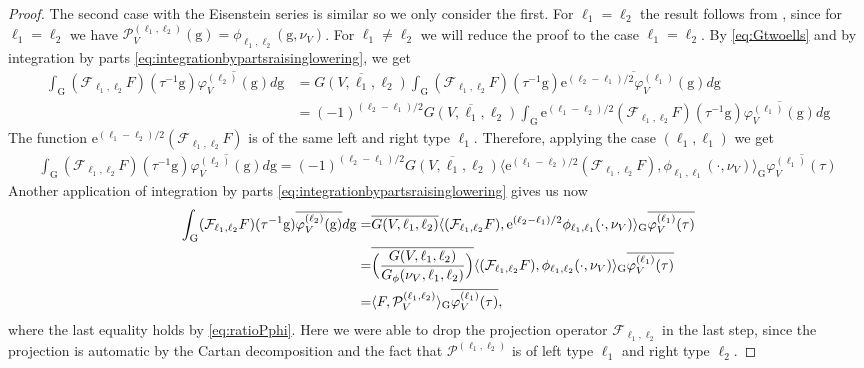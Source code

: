 \documentclass[12pt]{amsart}
\theoremstyle{definition}
\theoremstyle{remark}
\numberwithin{equation}{section}
\newcommand{\G}{\mathrm{G}}
\newcommand{\PP}{\mathcal{P}}
\newcommand{\1}{{\mathbf 1}}
\newcommand{\g}{\mathrm{g}}
\begin{document}
\begin{proof}
The second case with the Eisenstein series is similar so we only consider the first. For $\ell_1=\ell_2$ the result follows from  \cite[Proposition 5.2]{GM}, since for $\ell_1=\ell_2$ we have $\PP_V^{(\ell_1,\ell_2)}(\g) = \phi_{\ell_1,\ell_2}(\g,\nu_V)$. For $\ell_1\neq \ell_2$ we will reduce the proof to the case $\ell_1=\ell_2$. By \eqref{eq:Gtwoells} and by integration by parts  \eqref{eq:integrationbypartsraisinglowering}, we get
\begin{align*}
    \int_{\G} (\mathcal{F}_{\ell_1,\ell_2} F) (\tau^{-1} \g) \overline{\varphi_{V}^{(\ell_2)}(\g)} d \g &=  \overline{G(V,\ell_1,\ell_2)}    \int_{\G} (\mathcal{F}_{\ell_1,\ell_2} F) (\tau^{-1} \g) \overline{\mathrm{e}^{(\ell_2-\ell_1)/2}   \varphi_{V}^{(\ell_1)}(\g)} d \g  \\
   & = (-1)^{(\ell_2-\ell_1)/2} \overline{G(V,\ell_1,\ell_2) }    \int_{\G} \mathrm{e}^{(\ell_1-\ell_2)/2}(\mathcal{F}_{\ell_1,\ell_2} F) (\tau^{-1} \g) \overline{   \varphi_{V}^{(\ell_1)}(\g)} d \g
\end{align*}
The function $\mathrm{e}^{(\ell_1-\ell_2)/2}(\mathcal{F}_{\ell_1,\ell_2} F)  $ is of the same left and right type $\ell_1$. Therefore, applying the case $(\ell_1,\ell_1)$ we get
\begin{align*}
     \int_{\G} (\mathcal{F}_{\ell_1,\ell_2} F) (\tau^{-1} \g) \overline{\varphi_{V}^{(\ell_2)}(\g)} d \g  =  (-1)^{(\ell_2-\ell_1)/2} \overline{G(V,\ell_1,\ell_2) }   \langle \mathrm{e}^{(\ell_1-\ell_2)/2}(\mathcal{F}_{\ell_1,\ell_2} F) , \phi_{\ell_1,\ell_1}(\cdot,\nu_V)\rangle_\G \overline{\varphi_{V}^{(\ell_1)}(\tau)}
\end{align*}
Another application of integration by parts \eqref{eq:integrationbypartsraisinglowering} gives us now
\begin{align*}
     \int_{\G} (\mathcal{F}_{\ell_1,\ell_2} F) (\tau^{-1} \g) \overline{\varphi_{V}^{(\ell_2)}(\g)} d \g  =&  \overline{G(V,\ell_1,\ell_2) }   \langle (\mathcal{F}_{\ell_1,\ell_2} F) , \mathrm{e}^{(\ell_2-\ell_1)/2}\phi_{\ell_1,\ell_1}(\cdot,\nu_V)\rangle_\G \overline{\varphi_{V}^{(\ell_1)}(\tau)} \\
     =&  \overline{\Bigl(\frac{G(V,\ell_1,\ell_2) }{G_\phi(\nu_V,\ell_1,\ell_2)} \Bigr)}  \langle (\mathcal{F}_{\ell_1,\ell_2} F) , \phi_{\ell_1,\ell_2}(\cdot,\nu_V)\rangle_\G \overline{\varphi_{V}^{(\ell_1)}(\tau)}\\
     =&\langle F, \mathcal{P}^{(\ell_1,\ell_2)}_{V}\rangle_\G \overline{\varphi_{V}^{(\ell_1)}(\tau)},
\end{align*}
where the last equality holds by \eqref{eq:ratioPphi}. Here we were able to drop the projection operator $\mathcal{F}_{\ell_1,\ell_2}$ in the last step, since the projection is automatic by the Cartan decomposition and the fact that $\mathcal{P}^{(\ell_1,\ell_2)}$ is of left type $\ell_1$ and right type $\ell_2$.
\end{proof}
\end{document}
